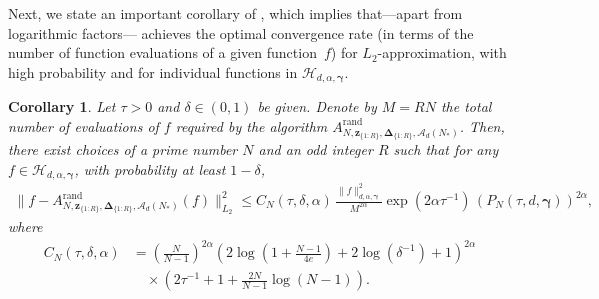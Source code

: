 \documentclass[pdflatex,sn-basic,Numbered]{sn-jnl}%
\newcommand{\rand}{\mathrm{rand}}
\newcommand{\bsz}{\boldsymbol{z}}
\newcommand{\bsgamma}{\boldsymbol{\gamma}}
\newcommand{\bsDelta}{\boldsymbol{\Delta}}
\newcommand{\Acal}{\mathcal{A}}
\newcommand{\Hcal}{\mathcal{H}}
\theoremstyle{thmstyleone}%
\newtheorem{corollary}[theorem]{Corollary}
\theoremstyle{thmstyletwo}%
\begin{document}
Next, we state an important corollary of , which implies that---apart from logarithmic factors--- achieves the optimal convergence rate (in terms of the number of function evaluations of a given function~$f$) for $L_2$-approximation, with high probability and for individual functions in $\Hcal_{d,\alpha,\bsgamma}$. 

\begin{corollary}\label{cor:error_bound}
 Let $\tau>0$ and $\delta \in (0,1)$ be given.
 Denote by $M = RN$ the total number of evaluations of $f$ required by the algorithm $A^{\rand}_{N,\bsz_{\{1{:}R\}},\bsDelta_{\{1{:}R\}},\Acal_d(N_*)}$.
 Then, there exist choices of a prime number $N$ and an odd integer $R$ such that for any $f \in \Hcal_{d,\alpha,\bsgamma}$, with probability at least $1 - \delta$,
 \begin{align*}
  \|f - A^{\rand}_{N,\bsz_{\{1{:}R\}},\bsDelta_{\{1{:}R\}},\Acal_d(N_*)}(f)\|^2_{L_2}
  \le C_N(\tau,\delta,\alpha)\, \frac{\|f\|^2_{d,\alpha,\bsgamma}}{M^{2\alpha}}
  \exp(2\alpha\tau^{-1})\, (P_N(\tau,d,\bsgamma))^{2\alpha},
 \end{align*}
 where
 \begin{align*}
  C_N(\tau,\delta,\alpha) &=
  \left(\frac{N}{N-1}\right)^{2\alpha}
  \left(2\log\left(1 + \frac{N-1}{4e}\right) + 2\log(\delta^{-1}) + 1\right)^{2\alpha} \\
  & \quad \times \left(2\tau^{-1} + 1 + \frac{2N}{N-1}\log(N-1)\right).
 \end{align*}
\end{corollary}
\end{document}
